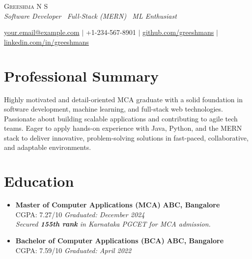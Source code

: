 \documentclass[letterpaper,9pt]{article}
\begin{document}
\begin{center}
  {\huge \scshape Greeshma N S} \\ \vspace{1.4pt}
  \textit{Software Developer \textbar\ Full-Stack (MERN) \textbar\ ML Enthusiast}


  \small
  \href{mailto:your.email@example.com}{your.email@example.com} $|$ 
  +1-234-567-8901 $|$
  \href{https://yourwebsite.com}{github.com/greeshmans} $|$
  \href{https://yourwebsite.com}{linkedin.com/in/greeshmans}
\end{center}

\section*{Professional Summary}
Highly motivated and detail-oriented MCA graduate with a solid foundation in software development, machine learning, and full-stack web technologies. Passionate about building scalable applications and contributing to agile tech teams. Eager to apply hands-on experience with Java, Python, and the MERN stack to deliver innovative, problem-solving solutions in fast-paced, collaborative, and adaptable environments.



\section*{Education}
\vspace{-4pt}

\begin{itemize}
  \item \textbf{Master of Computer Applications (MCA)} \hfill \textbf{ABC, Bangalore} \\
  CGPA: 7.27/10 \hfill \textit{Graduated: December 2024} \\
\textit{Secured \textbf{155th rank} in Karnataka PGCET for MCA admission.}
  
  \item \textbf{Bachelor of Computer Applications (BCA)} \hfill \textbf{ABC, Bangalore} \\
  CGPA: 7.59/10 \hfill \textit{Graduated: April 2022}
\end{itemize}

\end{document}
